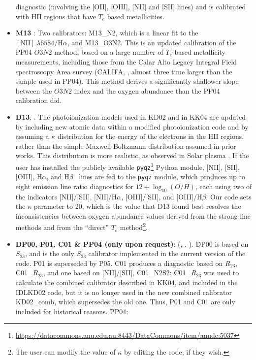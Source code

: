 \documentclass{emulateapj} \usepackage{amsmath} \usepackage{float}
\newcommand{\oxabinline}{\ensuremath{12 + \log_{10}(O/H)}}
\newcommand{\ha}{\ensuremath{\mathrm{H}\alpha}}
\newcommand{\hb}{\ensuremath{\mathrm{H}\beta}}
\begin{document}
\begin{itemize}
  diagnostic (involving the [OII], [OIII], [NII] and [SII] lines) and
  is calibrated with HII regions that have $T_e$ based metallicities.
\item {\bf M13} \citep{marino13}: Two calibrators: M13\_N2, which is a
  linear fit to the $\mathrm{[NII]}~\lambda6584/\ha$, and
  M13\_O3N2. This is an updated calibration of the PP04 $O3N2$ method,
  based on a large number of $T_e$-based metallicity measurements,
  including those from the Calar Alto Legacy Integral Field
  spectroscopy Area survey (CALIFA, \citealt{sanchez12}, almost three
  time larger than the sample used in PP04). This method derives a
  significantly shallower slope between the $O3N2$ index and the
  oxygen abundance than the PP04 calibration did.
\item {\bf D13}: \citep{dopita13}. The photoionization models used in
  KD02 and in KK04 are updated by including new atomic data within a
  modified photoionization code and by assuming a $\kappa$
  distribution for the energy of the electrons in the HII regions,
  rather than the simple Maxwell-Boltzmann distribution assumed in
  prior works. This distribution is more realistic, as observed in
  Solar plasma \citep{nicholls12}. If the user has installed the
  publicly available
  \verb=pyqz=\footnote{\url{https://datacommons.anu.edu.au:8443/DataCommons/item/anudc:5037}}
  Python module, [NII], [SII], [OIII], \ha, and \hb~ lines are fed to
  the \verb=pyqz= module, which produces up to eight emission line
  ratio diagnostics for \oxabinline, each using two of the indicators
  [NII]/[SII], [NII]/\ha, [OIII]/[SII], and [OIII]/\hb. Our code sets
  the $\kappa$ parameter to 20, which is the value that
  D13 found best resolves the inconsistencies between
  oxygen abundance values derived from the strong-line methods and
  from the ``direct'' $T_e$ method\footnote{The user can modify the
    value of $\kappa$ by editing the code, if they wish.}.
\item{\bf DP00, P01, C01 \& PP04 (only upon request)}:
  (\citealt{diaz00}, \citealt{pilyugin01}, \citealt{charlot01}). DP00
  is based on $S_{23}$, and is the only $S_{23}$ calibrator
  implemented in the current version of the code. P01 is superseded by
  P05. C01 produces a diagnostic based on $R_{23}$, C01\_$R_{23}$, and
  one based on [NII]/[SII], C01\_N2S2; C01\_$R_{23}$ was used to
  calculate the combined calibrator described in KK04, and included in
  the IDLKD02 code, but it is no longer used in the new combined
  calibrator KD02\_comb, which supersedes the old one. Thus, P01 and
  C01 are only included for historical reasons.  PP04:

\end{itemize}
\end{document}
